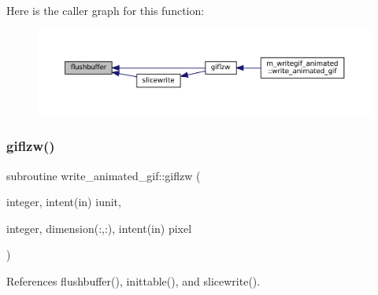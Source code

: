 Here is the caller graph for this function\+:\nopagebreak
\begin{figure}[H]
\begin{center}
\leavevmode
\includegraphics[width=350pt]{M__writegif__animated_8f90_a83cb0569b0e010d8ad27afd1b4cd945e_icgraph}
\end{center}
\end{figure}
\mbox{\label{M__writegif__animated_8f90_aa30b256c6cb90f13a18e32768d35696b}} 
\subsubsection{\texorpdfstring{giflzw()}{giflzw()}}
{\footnotesize\ttfamily subroutine write\+\_\+animated\+\_\+gif\+::giflzw (\begin{DoxyParamCaption}\item[{integer, intent(in)}]{iunit,  }\item[{integer, dimension(\+:,\+:), intent(in)}]{pixel }\end{DoxyParamCaption})\hspace{0.3cm}{\ttfamily [private]}}



References flushbuffer(), inittable(), and slicewrite().

